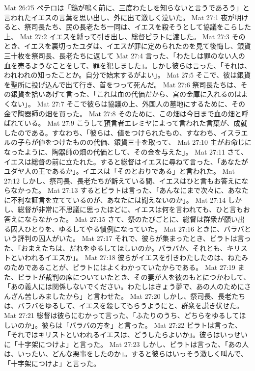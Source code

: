 Mat 26:75  ペテロは「鶏が鳴く前に、三度わたしを知らないと言うであろう」と言われたイエスの言葉を思い出し、外に出て激しく泣いた。
Mat 27:1  夜が明けると、祭司長たち、民の長老たち一同は、イエスを殺そうとして協議をこらした上、
Mat 27:2  イエスを縛って引き出し、総督ピラトに渡した。
Mat 27:3  そのとき、イエスを裏切ったユダは、イエスが罪に定められたのを見て後悔し、銀貨三十枚を祭司長、長老たちに返して
Mat 27:4  言った、「わたしは罪のない人の血を売るようなことをして、罪を犯しました」。しかし彼らは言った、「それは、われわれの知ったことか。自分で始末するがよい」。
Mat 27:5  そこで、彼は銀貨を聖所に投げ込んで出て行き、首をつって死んだ。
Mat 27:6  祭司長たちは、その銀貨を拾いあげて言った、「これは血の代価だから、宮の金庫に入れるのはよくない」。
Mat 27:7  そこで彼らは協議の上、外国人の墓地にするために、その金で陶器師の畑を買った。
Mat 27:8  そのために、この畑は今日まで血の畑と呼ばれている。
Mat 27:9  こうして預言者エレミヤによって言われた言葉が、成就したのである。すなわち、「彼らは、値をつけられたもの、すなわち、イスラエルの子らが値をつけたものの代価、銀貨三十を取って、
Mat 27:10  主がお命じになったように、陶器師の畑の代価として、その金を与えた」。
Mat 27:11  さて、イエスは総督の前に立たれた。すると総督はイエスに尋ねて言った、「あなたがユダヤ人の王であるか」。イエスは「そのとおりである」と言われた。
Mat 27:12  しかし、祭司長、長老たちが訴えている間、イエスはひと言もお答えにならなかった。
Mat 27:13  するとピラトは言った、「あんなにまで次々に、あなたに不利な証言を立てているのが、あなたには聞えないのか」。
Mat 27:14  しかし、総督が非常に不思議に思ったほどに、イエスは何を言われても、ひと言もお答えにならなかった。
Mat 27:15  さて、祭のたびごとに、総督は群衆が願い出る囚人ひとりを、ゆるしてやる慣例になっていた。
Mat 27:16  ときに、バラバという評判の囚人がいた。
Mat 27:17  それで、彼らが集まったとき、ピラトは言った、「おまえたちは、だれをゆるしてほしいのか。バラバか、それとも、キリストといわれるイエスか」。
Mat 27:18  彼らがイエスを引きわたしたのは、ねたみのためであることが、ピラトにはよくわかっていたからである。
Mat 27:19  また、ピラトが裁判の席についていたとき、その妻が人を彼のもとにつかわして、「あの義人には関係しないでください。わたしはきょう夢で、あの人のためにさんざん苦しみましたから」と言わせた。
Mat 27:20  しかし、祭司長、長老たちは、バラバをゆるして、イエスを殺してもらうようにと、群衆を説き伏せた。
Mat 27:21  総督は彼らにむかって言った、「ふたりのうち、どちらをゆるしてほしいのか」。彼らは「バラバの方を」と言った。
Mat 27:22  ピラトは言った、「それではキリストといわれるイエスは、どうしたらよいか」。彼らはいっせいに「十字架につけよ」と言った。
Mat 27:23  しかし、ピラトは言った、「あの人は、いったい、どんな悪事をしたのか」。すると彼らはいっそう激しく叫んで、「十字架につけよ」と言った。
